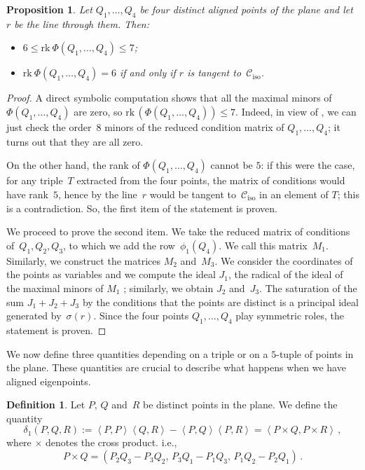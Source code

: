 \documentclass[11pt, a4paper, reqno, captions=tableheading,bibliography=totoc]{scrartcl}
\theoremstyle{plain}
\newtheorem{prop}[lemma]{Proposition}
\theoremstyle{definition}
\newtheorem{definition}[lemma]{Definition}
\newcommand{\iso}{\mathcal{C}_{\mathrm{iso}}}
\newcommand{\scl}[2]{\left\langle {#1}, {#2} \right\rangle}
\begin{document}
\begin{prop}
\label{proposition:four_aligned}
Let $Q_1, \dotsc, Q_4$ be four distinct aligned points of the plane and
let $r$ be the line through them. Then:
\begin{itemize}
\item $6 \leq \text{rk} \ \Phi(Q_1, \dotsc, Q_4) \leq 7$;
\item $\text{rk} \ \Phi(Q_1, \dotsc, Q_4) = 6$ if and only if $r$ is tangent
to~$\iso$.
\end{itemize}
\end{prop}
\begin{proof}
  A direct symbolic computation shows that all the maximal minors of~$\Phi(Q_1, \dotsc, Q_4)$ are
  zero, so $\mathrm{rk}\,(\Phi(Q_1, \dotsc, Q_4)) \leq 7$.
  Indeed, in view of , we can just check the order~$8$ minors of the reduced condition matrix of $Q_1, \dotsc, Q_4$; it turns out that they are all zero.

  On the other hand, the rank of $\Phi(Q_1, \dotsc, Q_4)$ cannot be $5$:
  if this were the case, for any triple~$T$ extracted from the four points, the matrix of conditions would have rank~$5$, hence by  the line~$r$ would be tangent to~$\iso$ in an element of $T$; this is a contradiction.
  So, the first item of the statement is proven.

  We proceed to prove the second item.
  We take the reduced matrix of conditions of~$Q_1, Q_2, Q_3$, to which we add the row~$\phi_1(Q_4)$.
  We call this matrix~$M_1$.
  Similarly, we construct the matrices $M_2$ and~$M_3$.
  We consider the coordinates of the points as variables and we compute
  the ideal $J_1$, the radical of the ideal of the maximal minors of $M_1$ ; similarly, we obtain $J_2$ and~$J_3$.
  The saturation of the sum $J_1 + J_2 + J_3$ by the conditions that the points are distinct is a principal ideal generated by~$\sigma(r)$.
  Since the four points $Q_1, \dotsc, Q_4$ play symmetric roles, the statement is proven.
\end{proof}

We now define three quantities depending on a triple or on a $5$-tuple of points in the plane.
These quantities are crucial to describe what happens when we have aligned eigenpoints.

\begin{definition}
\label{definition:delta1}
 Let $P$, $Q$ and~$R$ be distinct points in the plane.
 We define the quantity
 \[
  \delta_1(P, Q, R) :=
  \scl{P}{P} \scl{Q}{R} - \scl{P}{Q}\scl{P}{R}
  =
  \scl{P\times Q}{P \times R} \,,
 \]
 where $\times$ denotes the cross product. i.e.,
 \[
  P \times Q = (P_2 Q_3 - P_3 Q_2, \, P_3 Q_1 - P_1 Q_3, \, P_1 Q_2 - P_2 Q_1) \,.
 \]

\end{definition}
\end{document}
